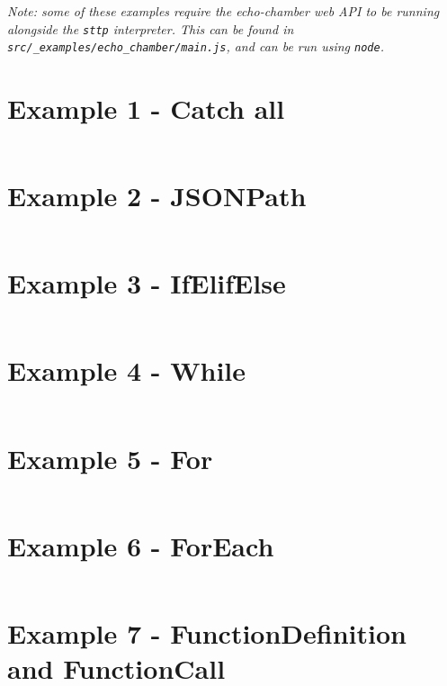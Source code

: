 \documentclass[]{full}
\theoremstyle{definition}
\begin{document}
\cprotect\textit{Note: some of these examples require the echo-chamber web API to be running alongside the \verb|sttp| interpreter. This can be found in \verb|src/_examples/echo_chamber/main.js|, and can be run using \verb|node|.}

\section{Example 1 - Catch all}
\label{appendix:sttp-examples-1}
\inputminted[autogobble, breaklines, tabsize=4]{text}{../../src/_examples/example_01/example_01.sttp}

\section{Example 2 - JSONPath}
\label{appendix:sttp-examples-2}
\inputminted[autogobble, breaklines, tabsize=4]{text}{../../src/_examples/example_02/example_02.sttp}

\section{Example 3 - IfElifElse}
\label{appendix:sttp-examples-3}
\inputminted[autogobble, breaklines, tabsize=4]{text}{../../src/_examples/example_03/example_03.sttp}

\section{Example 4 - While}
\label{appendix:sttp-examples-4}
\inputminted[autogobble, breaklines, tabsize=4]{text}{../../src/_examples/example_04/example_04.sttp}

\section{Example 5 - For}
\label{appendix:sttp-examples-5}
\inputminted[autogobble, breaklines, tabsize=4]{text}{../../src/_examples/example_05/example_05.sttp}

\section{Example 6 - ForEach}
\label{appendix:sttp-examples-6}
\inputminted[autogobble, breaklines, tabsize=4]{text}{../../src/_examples/example_06/example_06.sttp}

\section{Example 7 - FunctionDefinition and FunctionCall}
\label{appendix:sttp-examples-7}
\inputminted[autogobble, breaklines, tabsize=4]{text}{../../src/_examples/example_07/example_07.sttp}
\end{document}
